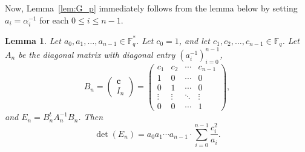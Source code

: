 \documentclass[12pt,reqno]{amsart}
\newtheorem{lem}[thm]{Lemma}
\theoremstyle{definition}
\newcommand{\F}{\mathbb{F}}
\begin{document}
Now, Lemma~\ref{lem:G_p} immediately follows from the lemma below by setting $a_i=\alpha_{i}^{-1}$ for each $0\leq i\leq n-1$.
\begin{lem}
Let $a_0, a_1, \ldots, a_{n-1} \in \F_q^*$. Let $c_0=1$, and let $c_1,c_2,\ldots, c_{n-1} \in \F_q$.  Let $A_n$ be the diagonal matrix with diagonal entry $(a_i^{-1})_{i=0}^{n-1}$, 
$$
B_n=\begin{pmatrix} \mathbf{c} \\ I_n \end{pmatrix} = 
\begin{pmatrix} 
c_1&c_2&\cdots &c_{n-1}\\
1&0&\cdots&0\\
0&1&\cdots&0\\
\vdots&\vdots&\ddots&\vdots\\
0&0&\cdots&1
\end{pmatrix},
$$
and $E_n=B_n^{t} A_n^{-1}B_n$. Then $$
\det(E_n)=a_0a_1\cdots a_{n-1} \cdot \sum_{i=0}^{n-1} \frac{c_i^2}{a_i}.
$$
\end{lem}
\end{document}
